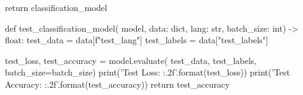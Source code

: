 \begin{python}
  return classification_model


def test_classification_model(
    model, data: dict, lang: str,
    batch_size: int) -> float:
  test_data = data[f"test_{lang}"]
  test_labels = data["test_labels"]

  test_loss, test_accuracy = model.evaluate(
    test_data, test_labels,
    batch_size=batch_size)
  print('Test Loss: {:.2f}'.format(test_loss))
  print('Test Accuracy: {:.2f}'.format(test_accuracy))
  return test_accuracy

\end{python}
